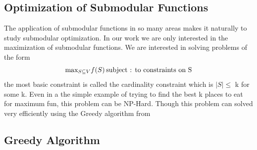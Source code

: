 \documentclass[a4paper,twoside]{iiththesis}
\theoremstyle{definition}
\theoremstyle{definition}
\theoremstyle{remark}
\begin{document}
\subsection{Optimization of Submodular Functions}
The application of submodular functions in so many areas makes it naturally to study submodular optimization. In our work we are only interested in the maximization of submodular functions. We are interested in solving problems of the form 
\begin{equation}
	\text{max}_{S\subseteq V} f(S) \hspace{1.8pt} \text{subject : to constraints on S}
\end{equation}
the most basic constraint is called the cardinality constraint which is $ |S| \leq$ k for some k. Even in a the simple example of trying to find the best k places to eat for maximum fun, this problem can be NP-Hard. Though this problem can solved very efficiently using the Greedy algorithm from \cite{nemhauser}

\subsection{Greedy Algorithm}
\end{document}
